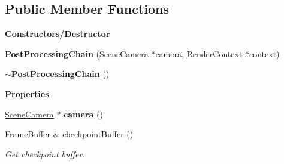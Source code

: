 \subsection*{Public Member Functions}
\begin{Indent}\textbf{ Constructors/\+Destructor}\par
\begin{DoxyCompactItemize}
\item 
\mbox{\label{classrev_1_1_post_processing_chain_acd4b273417287311d47972e7721310d9}} 
{\bfseries Post\+Processing\+Chain} (\mbox{\hyperlink{classrev_1_1_scene_camera}{Scene\+Camera}} $\ast$camera, \mbox{\hyperlink{classrev_1_1_render_context}{Render\+Context}} $\ast$context)
\item 
\mbox{\label{classrev_1_1_post_processing_chain_a53e91ea30a2be1520b876b0d448cddd0}} 
{\bfseries $\sim$\+Post\+Processing\+Chain} ()
\end{DoxyCompactItemize}
\end{Indent}
\begin{Indent}\textbf{ Properties}\par
\begin{DoxyCompactItemize}
\item 
\mbox{\label{classrev_1_1_post_processing_chain_ad3d3f6512c6743efd38420ceea54164e}} 
\mbox{\hyperlink{classrev_1_1_scene_camera}{Scene\+Camera}} $\ast$ {\bfseries camera} ()
\item 
\mbox{\label{classrev_1_1_post_processing_chain_a30955b9bbf8b98c73292163ec81f1ea0}} 
\mbox{\hyperlink{classrev_1_1_frame_buffer}{Frame\+Buffer}} \& \mbox{\hyperlink{classrev_1_1_post_processing_chain_a30955b9bbf8b98c73292163ec81f1ea0}{checkpoint\+Buffer}} ()
\begin{DoxyCompactList}\small\item\em Get checkpoint buffer. \end{DoxyCompactList}\end{DoxyCompactItemize}
\end{Indent}
